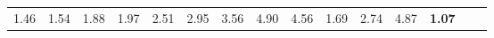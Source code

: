 \begin{tabular}{ll|rrrrrrrrr|rrrr}
  


  
  1.46 & 1.54 & 1.88 & 1.97 & 2.51 & 2.95 & 3.56 & 4.90 & 4.56 & 1.69 & 2.74 & 4.87 & \textbf{1.07} \\


\end{tabular}
